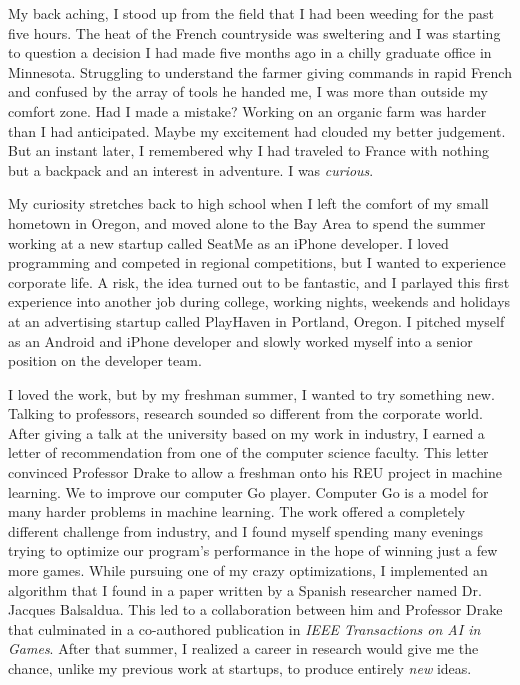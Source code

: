 \documentclass[12pt]{article}
\title{}
\begin{document}
My back aching, I stood up from the field that I had been weeding for the past five hours. The heat of the French countryside was sweltering and I was starting to question a  decision I had made five months ago in a chilly graduate office in Minnesota. Struggling to understand the farmer giving commands in rapid French and confused by the array of tools he handed me, I was more than outside my comfort zone. Had I made a mistake? Working on an organic farm was harder than I had anticipated. Maybe my excitement had clouded my better judgement. But an instant later, I remembered why I had traveled to France with nothing but a backpack and an interest in adventure. I was \textit{curious}.  

My curiosity stretches back to high school when I left the comfort of my small hometown in Oregon, and moved alone to the Bay Area to spend the summer working at a new startup called SeatMe as an iPhone developer. I loved programming and competed in regional competitions, but I wanted to experience corporate life. A risk, the idea turned out to be fantastic, and I parlayed this first experience into another job during college, working nights, weekends and holidays at an advertising startup called PlayHaven in Portland, Oregon. I pitched myself as an Android and iPhone developer and slowly worked myself into a senior position on the developer team. 

I loved the work, but by my freshman summer, I wanted to try something new. Talking to professors, research sounded so different from the corporate world. After giving a talk at the university based on my work in industry, I earned a letter of recommendation from one of the computer science faculty. This letter convinced Professor Drake to allow a freshman onto his REU project in machine learning. We to improve our computer Go player. Computer Go is a model for many harder problems in machine learning. The work offered a completely different challenge from industry, and I found myself spending many evenings trying to optimize our program's performance in the hope of winning just a few more games. While pursuing one of my crazy optimizations, I implemented an algorithm that I found in a paper written by a Spanish researcher named Dr. Jacques Balsaldua. This led to a collaboration between him and Professor Drake that culminated in a co-authored publication in \textit{IEEE Transactions on AI in Games}. After that summer, I realized a career in research would give me the chance, unlike my previous work at startups, to produce entirely \textit{new} ideas.
\end{document}
